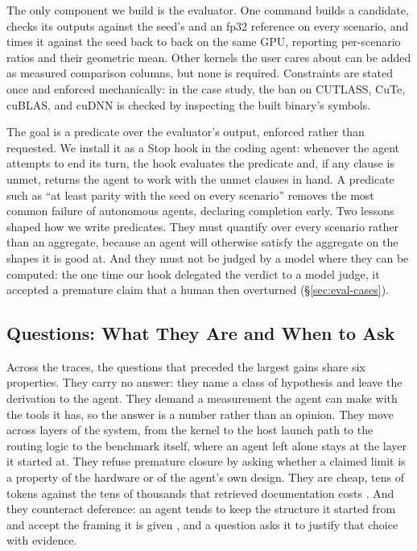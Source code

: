 The only component we build is the evaluator. One command builds a candidate, checks its outputs
against the seed's and an fp32 reference on every scenario, and times it against the seed back to
back on the same GPU, reporting per-scenario ratios and their geometric mean. Other kernels the user
cares about can be added as measured comparison columns, but none is required. Constraints are
stated once and enforced mechanically: in the case study, the ban on CUTLASS, CuTe, cuBLAS, and
cuDNN is checked by inspecting the built binary's symbols.

The goal is a predicate over the evaluator's output, enforced rather than requested. We install it
as a Stop hook in the coding agent: whenever the agent attempts to end its turn, the hook evaluates
the predicate and, if any clause is unmet, returns the agent to work with the unmet clauses in hand.
A predicate such as ``at least parity with the seed on every scenario'' removes the most common
failure of autonomous agents, declaring completion early. Two lessons shaped how we write
predicates. They must quantify over every scenario rather than an aggregate, because an agent will
otherwise satisfy the aggregate on the shapes it is good at. And they must not be judged by a model
where they can be computed: the one time our hook delegated the verdict to a model judge, it
accepted a premature claim that a human then overturned (\S\ref{sec:eval-cases}).

\subsection{Questions: What They Are and When to Ask}
\label{sec:workflow-questions}
\label{sec:good-questions}
\label{sec:workflow-when}


Across the traces, the questions that preceded the largest gains share six properties. They carry
no answer: they name a class of hypothesis and leave the derivation to the agent. They demand a
measurement the agent can make with the tools it has, so the answer is a number rather than an
opinion. They move across layers of the system, from the kernel to the host launch path to the
routing logic to the benchmark itself, where an agent left alone stays at the layer it started at.
They refuse premature closure by asking whether a claimed limit is a property of the hardware or of
the agent's own design. They are cheap, tens of tokens against the tens of thousands that retrieved
documentation costs \cite{liu2024lost,langchain2025toolload}. And they counteract deference: an
agent tends to keep the structure it started from and accept the framing it is given
\cite{sharma2024sycophancy}, and a question asks it to justify that choice with evidence.

